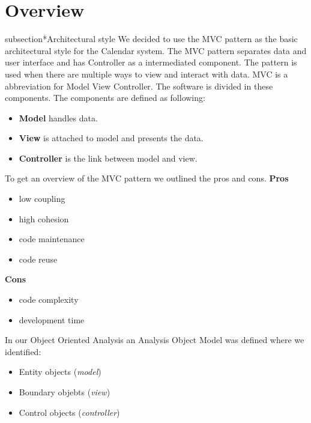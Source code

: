 \section*{Overview}

subsection*{Architectural style}
\newline
 We decided to use the MVC pattern as the basic architectural style for the Calendar system.
\newline
\newline
The MVC pattern separates data and user interface and has Controller as a intermediated component. The pattern is used when there are multiple ways to view and interact with data.
\newline
\newline
MVC is a abbreviation for Model View Controller. The software is divided in these components. The components are defined as following:
\begin{itemize}
	\item \textbf{Model} handles data.
	\item \textbf{View} is attached to model and presents the data.
	\item \textbf{Controller} is the link between model and view. 
\end{itemize}
\bigskip


To get an overview of the MVC pattern we outlined the pros and cons.
\newline
\textbf{Pros}
\begin{itemize}
	\item low coupling
	\item high cohesion
	\item code maintenance
	\item code reuse
\end{itemize}
\textbf{Cons}
\begin{itemize}
	\item code complexity
	\item development time
\end{itemize}

\newpage
In our Object Oriented Analysis an Analysis Object Model was defined where we identified:
\begin{itemize}
	\item Entity objects (\emph{model})
	\item Boundary objebts (\emph{view})
	\item Control objects (\emph{controller})
\end{itemize}


